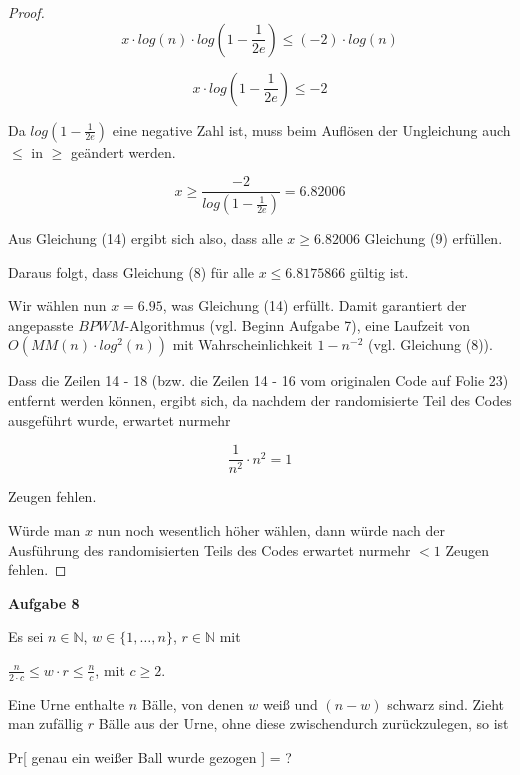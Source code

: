\documentclass{article}
\begin{document}
\begin{proof}
  \begin{equation}
    x \cdot log \left( n \right) \cdot log \left( 1 - \frac{1}{2e} \right) \leq (-2) \cdot log \left( n \right)
  \end{equation}

  \begin{equation}
    x \cdot log \left( 1 - \frac{1}{2e} \right) \leq -2
  \end{equation}

  Da $log \left( 1 - \frac{1}{2e} \right)$ eine negative Zahl ist, muss beim
  Aufl{\"o}sen der Ungleichung auch $\leq$ in $\geq$ ge{\"a}ndert werden.

  \begin{equation}
    x \geq \frac{-2}{log \left( 1 - \frac{1}{2e} \right)} = 6.82006
  \end{equation}

  Aus Gleichung (14) ergibt sich also, dass alle $x \geq 6.82006$ Gleichung (9)
  erf{\"u}llen. \newline

  Daraus folgt, dass Gleichung (8) f{\"u}r alle $x \leq 6.8175866$ g{\"u}ltig ist.

  Wir w{\"a}hlen nun $x = 6.95$, was Gleichung (14) erf{\"u}llt. \newline
  Damit garantiert der angepasste $BPWM$-Algorithmus (vgl. Beginn Aufgabe 7),
  eine Laufzeit von $O \left( MM \left( n \right) \cdot log^2(n) \right)$ mit
  Wahrscheinlichkeit $1 - n^{-2}$  (vgl. Gleichung (8)).

  Dass die Zeilen 14 - 18 (bzw. die Zeilen 14 - 16 vom originalen Code auf Folie
  23) entfernt werden k{\"o}nnen, ergibt sich, da nachdem der randomisierte
  Teil des Codes ausgef{\"u}hrt wurde, erwartet nurmehr

  \begin{equation}
    \frac{1}{n^2} \cdot n^2 = 1
  \end{equation}

  Zeugen fehlen.

  W{\"u}rde man $x$ nun noch wesentlich h{\"o}her w{\"a}hlen, dann w{\"u}rde
  nach der Ausf{\"u}hrung des randomisierten Teils des Codes erwartet nurmehr
  $< 1$ Zeugen fehlen.
\end{proof}

\newpage
{\noindent\bfseries Aufgabe 8}%
\medskip%

\noindent
Es sei $n \in \mathbb{N}$, $w \in \{ 1, \ldots, n \}$, $r \in \mathbb{N}$ mit
\begin{center}
  $\frac{n}{2 \cdot c} \leq w \cdot r \leq \frac{n}{c}$, mit $c \geq 2$.
\end{center}
Eine Urne enthalte $n$ B{\"a}lle, von denen $w$ wei{\ss} und $(n - w)$ schwarz sind.
Zieht man zuf{\"a}llig $r$ B{\"a}lle aus der Urne, ohne diese zwischendurch
zur{\"u}ckzulegen, so ist
\begin{center}
  Pr[ genau ein wei{\ss}er Ball wurde gezogen ] = ?
\end{center}
\end{document}
